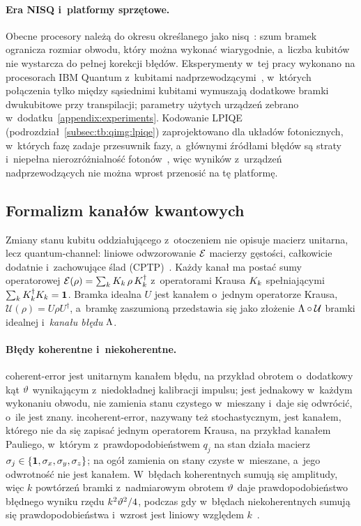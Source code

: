 \paragraph{Era NISQ i~platformy sprzętowe.}
Obecne procesory należą do okresu określanego jako \gls{nisq}~\cite{preskill_quantum_2018}: szum bramek ogranicza rozmiar obwodu, który można wykonać wiarygodnie, a~liczba kubitów nie wystarcza do pełnej korekcji błędów.
Eksperymenty w~tej pracy wykonano na procesorach IBM Quantum z~kubitami nadprzewodzącymi~\cite{krantz_quantum_2019}, w~których połączenia tylko między sąsiednimi kubitami wymuszają dodatkowe bramki dwukubitowe przy transpilacji; parametry użytych urządzeń zebrano w~dodatku~\ref{appendix:experiments}.
Kodowanie LPIQE (podrozdział~\ref{subsec:tb:qimg:lpiqe}) zaprojektowano dla układów fotonicznych, w~których fazę zadaje przesuwnik fazy, a~głównymi źródłami błędów są straty i~niepełna nierozróżnialność fotonów~\cite{slussarenko_photonic_2019,taballione_20-mode_2022}, więc wyników z~urządzeń nadprzewodzących nie można wprost przenosić na tę platformę.

\subsection{Formalizm kanałów kwantowych}\label{subsec:tb:noise:channels}

Zmiany stanu kubitu oddziałującego z~otoczeniem nie opisuje macierz unitarna, lecz \gls{quantum-channel}: liniowe odwzorowanie $\mathcal{E}$ macierzy gęstości, całkowicie dodatnie i~zachowujące ślad (CPTP)~\cite{NielsenChuang2010,bib:quantum_noise}.
Każdy kanał ma postać sumy operatorowej $\mathcal{E}(\rho)=\sum_{k}K_k\,\rho\,K_k^{\dagger}$ z~operatorami Krausa $K_k$ spełniającymi $\sum_{k}K_k^{\dagger}K_k=\mathbf{1}$.
Bramka idealna $U$ jest kanałem o~jednym operatorze Krausa, $\mathcal{U}(\rho)=U\rho U^{\dagger}$, a~bramkę zaszumioną przedstawia się jako złożenie $\Lambda\circ\mathcal{U}$ bramki idealnej i~\emph{kanału błędu} $\Lambda$.

\paragraph{Błędy koherentne i~niekoherentne.}
\Gls{coherent-error} jest unitarnym kanałem błędu, na przykład obrotem o~dodatkowy kąt $\vartheta$ wynikającym z~niedokładnej kalibracji impulsu; jest jednakowy w~każdym wykonaniu obwodu, nie zamienia stanu czystego w~mieszany i~daje się odwrócić, o~ile jest znany.
\Gls{incoherent-error}, nazywany też stochastycznym, jest kanałem, którego nie da się zapisać jednym operatorem Krausa, na przykład kanałem Pauliego, w~którym z~prawdopodobieństwem $q_j$ na stan działa macierz $\sigma_j\in\{\mathbf{1},\sigma_x,\sigma_y,\sigma_z\}$; na ogół zamienia on stany czyste w~mieszane, a~jego odwrotność nie jest kanałem.
W~błędach koherentnych sumują się amplitudy, więc $k$ powtórzeń bramki z~nadmiarowym obrotem $\vartheta$ daje prawdopodobieństwo błędnego wyniku rzędu $k^2\vartheta^2/4$, podczas gdy w~błędach niekoherentnych sumują się prawdopodobieństwa i~wzrost jest liniowy względem $k$~\cite{Wallman2015,Hashim2023}.

